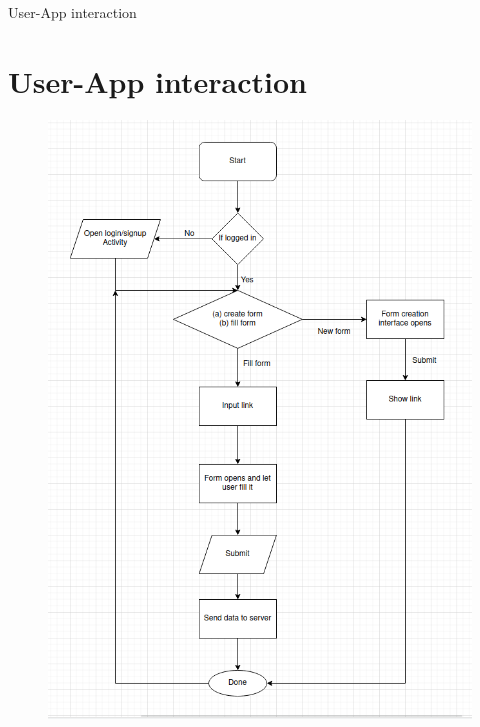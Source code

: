 \documentclass{beamer}
\begin{document}
\begin{frame}{User-App interaction}
    \section{User-App interaction}
    \begin{figure}
        \includegraphics[width=0.45\columnwidth]{images/AppWorking.png}
    \end{figure}
\end{frame}
\end{document}
